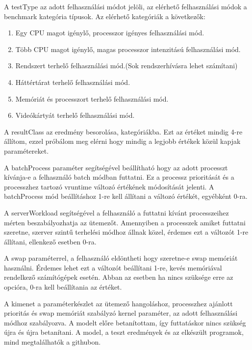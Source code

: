A testType az adott felhasználási módot jelöli, az elérhető felhasználási módok a benchmark kategória típusok. Az elérhető kategóriák a következők: 
\begin{enumerate}
\item Egy CPU magot igénylő, processzor igényes felhasználási mód.
\item Több CPU magot igénylő, magas processzor intenzitású felhasználási mód.
\item Rendszert terhelő felhasználási mód.(Sok rendszerhívásra lehet számítani)
\item Háttértárat terhelő felhasználási mód.
\item Memóriát és processzort terhelő felhasználási mód.
\item Videókártyát terhelő felhasználási mód.
\end{enumerate}

A resultClass az eredmény besorolása, kategóriákba. Ezt az értéket mindig 4-re állítom, ezzel próbálom meg elérni hogy mindig a legjobb értékek közül kapjak paramétereket.

A batchProcess paraméter segítségével beállítható hogy az adott processzt kívánja-e a felhasználó batch módban futtatni. Ez a processz prioritását és a processzhez tartozó vruntime változó értékének módosítását jelenti. A batchProcess mód beállításhoz 1-re kell állítani a változó értékét, egyébként 0-ra.

A serverWorkload segítségével a felhasználó a futtatni kívánt processzeihez mérten beszabályozhatja az ütemezőt. Amennyiben a processzek amiket futtatni szeretne, szerver szintű terhelési módhoz állnak közel, érdemes ezt a változót 1-re állítani, ellenkező esetben 0-ra.

A swap paraméterrel, a felhasználó eldöntheti hogy szeretne-e swap memóriát használni. Érdemes lehet ezt a változót beállítani 1-re, kevés memóriával rendelkező számítógépek esetén. Abban az esetben ha nincs szüksége erre az opcióra, 0-ra kell beállítania az értéket.

A kimenet a paraméterkészlet az ütemező hangoláshoz, processzhez ajánlott prioritás és swap memóriát szabályzó kernel paraméter, az adott felhasználási módhoz szabályozva.
A modelt előre betanítottam, így futtatáskor nincs szükség újra és újra betanítani. A model, a teszt eredmények és az elkészült programok, mind megtalálhatók a githubon.